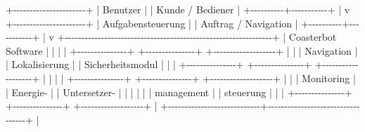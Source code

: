 \documentclass[
  a4paper,
  12pt,
  DIV=12,        %
  parskip=half,  %
  headings=small %
]{scrartcl}
\theoremstyle{definition}
\theoremstyle{definition}
\newenvironment{Shaded}{}{}
\newcommand{\NormalTok}[1]{#1}
\begin{document}
\begin{Shaded}
\begin{Highlighting}[]
\NormalTok{                         +{-}{-}{-}{-}{-}{-}{-}{-}{-}{-}{-}{-}{-}{-}{-}{-}{-}{-}{-}{-}{-}{-}+}
\NormalTok{                         |       Benutzer       |}
\NormalTok{                         |  Kunde / Bediener    |}
\NormalTok{                         +{-}{-}{-}{-}{-}{-}{-}{-}{-}{-}+{-}{-}{-}{-}{-}{-}{-}{-}{-}{-}{-}+}
\NormalTok{                                    |}
\NormalTok{                                    v}
\NormalTok{                         +{-}{-}{-}{-}{-}{-}{-}{-}{-}{-}{-}{-}{-}{-}{-}{-}{-}{-}{-}{-}{-}{-}+}
\NormalTok{                         |  Aufgabensteuerung   |}
\NormalTok{                         | Auftrag / Navigation |}
\NormalTok{                         +{-}{-}{-}{-}{-}{-}{-}{-}{-}{-}+{-}{-}{-}{-}{-}{-}{-}{-}{-}{-}{-}+}
\NormalTok{                                    |}
\NormalTok{                                    v}
\NormalTok{+{-}{-}{-}{-}{-}{-}{-}{-}{-}{-}{-}{-}{-}{-}{-}{-}{-}{-}{-}{-}{-}{-}{-}{-}{-}{-}{-}{-}{-}{-}{-}{-}{-}{-}{-}{-}{-}{-}{-}{-}{-}{-}{-}{-}{-}{-}{-}{-}{-}{-}{-}{-}{-}{-}{-}{-}{-}{-}{-}{-}{-}{-}{-}+}
\NormalTok{|                    Coasterbot Software                        |}
\NormalTok{|                                                               |}
\NormalTok{| +{-}{-}{-}{-}{-}{-}{-}{-}{-}{-}{-}{-}{-}{-}{-}+  +{-}{-}{-}{-}{-}{-}{-}{-}{-}{-}{-}{-}{-}{-}{-}+  +{-}{-}{-}{-}{-}{-}{-}{-}{-}{-}{-}{-}{-}{-}{-}{-}{-}{-}{-}+   |}
\NormalTok{| | Navigation    |  | Lokalisierung |  | Sicherheitsmodul  |   |}
\NormalTok{| +{-}{-}{-}{-}{-}{-}{-}{-}{-}{-}{-}{-}{-}{-}{-}+  +{-}{-}{-}{-}{-}{-}{-}{-}{-}{-}{-}{-}{-}{-}{-}+  +{-}{-}{-}{-}{-}{-}{-}{-}{-}{-}{-}{-}{-}{-}{-}{-}{-}{-}{-}+   |}
\NormalTok{|                                                               |}
\NormalTok{| +{-}{-}{-}{-}{-}{-}{-}{-}{-}{-}{-}{-}{-}{-}{-}+  +{-}{-}{-}{-}{-}{-}{-}{-}{-}{-}{-}{-}{-}{-}{-}+  +{-}{-}{-}{-}{-}{-}{-}{-}{-}{-}{-}{-}{-}{-}{-}{-}{-}{-}{-}+   |}
\NormalTok{| | Monitoring    |  | Energie{-}      |  | Untersetzer{-}      |   |}
\NormalTok{| |               |  | management    |  | steuerung         |   |}
\NormalTok{| +{-}{-}{-}{-}{-}{-}{-}{-}{-}{-}{-}{-}{-}{-}{-}+  +{-}{-}{-}{-}{-}{-}{-}{-}{-}{-}{-}{-}{-}{-}{-}+  +{-}{-}{-}{-}{-}{-}{-}{-}{-}{-}{-}{-}{-}{-}{-}{-}{-}{-}{-}+   |}
\NormalTok{+{-}{-}{-}{-}{-}{-}{-}{-}{-}{-}{-}{-}{-}{-}{-}{-}{-}{-}{-}{-}{-}{-}{-}{-}{-}{-}{-}{-}+{-}{-}{-}{-}{-}{-}{-}{-}{-}{-}{-}{-}{-}{-}{-}{-}{-}{-}{-}{-}{-}{-}{-}{-}{-}{-}{-}{-}{-}{-}{-}{-}{-}{-}+}
\NormalTok{                             |}

\end{Highlighting}
\end{Shaded}
\end{document}
